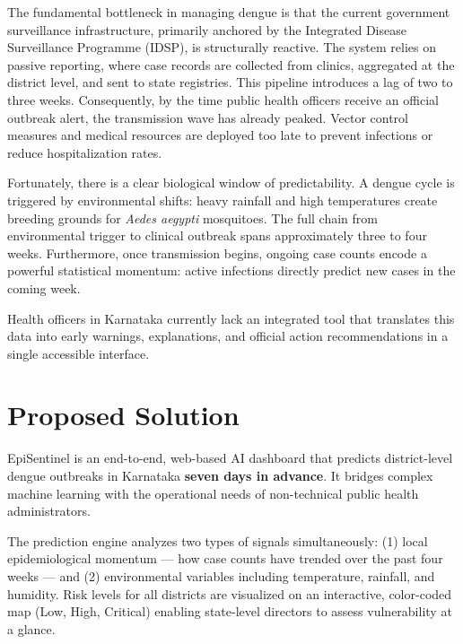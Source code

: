 \documentclass[11pt,a4paper]{article}
\begin{document}
The fundamental bottleneck in managing dengue is that the current government surveillance infrastructure, primarily anchored by the Integrated Disease Surveillance Programme (IDSP), is structurally reactive. The system relies on passive reporting, where case records are collected from clinics, aggregated at the district level, and sent to state registries. This pipeline introduces a lag of two to three weeks. Consequently, by the time public health officers receive an official outbreak alert, the transmission wave has already peaked. Vector control measures and medical resources are deployed too late to prevent infections or reduce hospitalization rates.

Fortunately, there is a clear biological window of predictability. A dengue cycle is triggered by environmental shifts: heavy rainfall and high temperatures create breeding grounds for \textit{Aedes aegypti} mosquitoes. The full chain from environmental trigger to clinical outbreak spans approximately three to four weeks. Furthermore, once transmission begins, ongoing case counts encode a powerful statistical momentum: active infections directly predict new cases in the coming week.

Health officers in Karnataka currently lack an integrated tool that translates this data into early warnings, explanations, and official action recommendations in a single accessible interface.

\section{Proposed Solution}
\label{sec:solution}

EpiSentinel is an end-to-end, web-based AI dashboard that predicts district-level dengue outbreaks in Karnataka \textbf{seven days in advance}. It bridges complex machine learning with the operational needs of non-technical public health administrators.

The prediction engine analyzes two types of signals simultaneously: (1) local epidemiological momentum --- how case counts have trended over the past four weeks --- and (2) environmental variables including temperature, rainfall, and humidity. Risk levels for all districts are visualized on an interactive, color-coded map (Low, High, Critical) enabling state-level directors to assess vulnerability at a glance.
\end{document}
